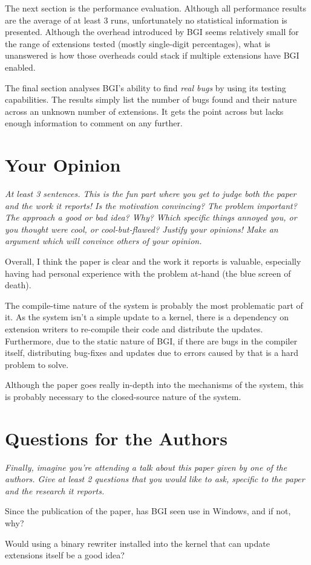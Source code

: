 \documentclass[11pt]{article}
\begin{document}
The next section is the performance evaluation. Although all performance
results are the average of at least 3 runs, unfortunately no statistical
information is presented. Although the overhead introduced by BGI seems
relatively small for the range of extensions tested (mostly single-digit
percentages), what is unanswered is how those overheads could stack if multiple
extensions have BGI enabled.

The final section analyses BGI's ability to find \textit{real bugs} by using
its testing capabilities. The results simply list the number of bugs found and
their nature across an unknown number of extensions. It gets the point across
but lacks enough information to comment on any further.


\section*{Your Opinion}

\textsl{At least 3 sentences. This is the fun part where you get to judge both
the paper and the work it reports! Is the motivation convincing? The problem
important? The approach a good or bad idea? Why? Which specific things annoyed
you, or you thought were cool, or cool-but-flawed? Justify your opinions! Make
an argument which will convince others of your opinion.}

Overall, I think the paper is clear and the work it reports is valuable,
especially having had personal experience with the problem at-hand (the blue
screen of death).

The compile-time nature of the system is probably the most problematic part of
it. As the system isn't a simple update to a kernel, there is a dependency on
extension writers to re-compile their code and distribute the updates.
Furthermore, due to the static nature of BGI, if there are bugs in the compiler
itself, distributing bug-fixes and updates due to errors caused by that is a
hard problem to solve.

Although the paper goes really in-depth into the mechanisms of the system, this
is probably necessary to the closed-source nature of the system.


\section*{Questions for the Authors}

\textsl{Finally, imagine you're attending a talk about this paper given by one
of the authors. Give at least 2 questions that you would like to ask, specific
to the paper and the research it reports.}

Since the publication of the paper, has BGI seen use in Windows, and if not,
why?

Would using a binary rewriter installed into the kernel that can update
extensions itself be a good idea?




\end{document}

